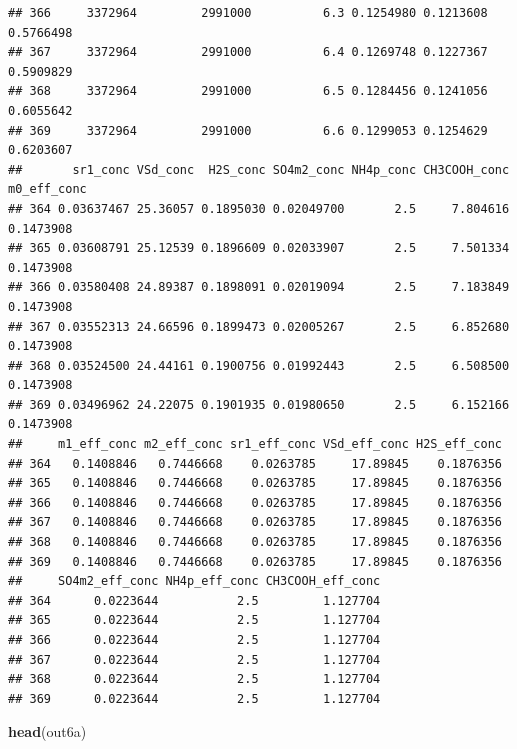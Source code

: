 \documentclass[
]{article}
\newenvironment{Shaded}{\begin{snugshade}}{\end{snugshade}}
\newcommand{\FunctionTok}[1]{\textcolor[rgb]{0.13,0.29,0.53}{\textbf{#1}}}
\newcommand{\NormalTok}[1]{#1}
\begin{document}
\begin{verbatim}
## 366     3372964         2991000          6.3 0.1254980 0.1213608 0.5766498
## 367     3372964         2991000          6.4 0.1269748 0.1227367 0.5909829
## 368     3372964         2991000          6.5 0.1284456 0.1241056 0.6055642
## 369     3372964         2991000          6.6 0.1299053 0.1254629 0.6203607
##       sr1_conc VSd_conc  H2S_conc SO4m2_conc NH4p_conc CH3COOH_conc m0_eff_conc
## 364 0.03637467 25.36057 0.1895030 0.02049700       2.5     7.804616   0.1473908
## 365 0.03608791 25.12539 0.1896609 0.02033907       2.5     7.501334   0.1473908
## 366 0.03580408 24.89387 0.1898091 0.02019094       2.5     7.183849   0.1473908
## 367 0.03552313 24.66596 0.1899473 0.02005267       2.5     6.852680   0.1473908
## 368 0.03524500 24.44161 0.1900756 0.01992443       2.5     6.508500   0.1473908
## 369 0.03496962 24.22075 0.1901935 0.01980650       2.5     6.152166   0.1473908
##     m1_eff_conc m2_eff_conc sr1_eff_conc VSd_eff_conc H2S_eff_conc
## 364   0.1408846   0.7446668    0.0263785     17.89845    0.1876356
## 365   0.1408846   0.7446668    0.0263785     17.89845    0.1876356
## 366   0.1408846   0.7446668    0.0263785     17.89845    0.1876356
## 367   0.1408846   0.7446668    0.0263785     17.89845    0.1876356
## 368   0.1408846   0.7446668    0.0263785     17.89845    0.1876356
## 369   0.1408846   0.7446668    0.0263785     17.89845    0.1876356
##     SO4m2_eff_conc NH4p_eff_conc CH3COOH_eff_conc
## 364      0.0223644           2.5         1.127704
## 365      0.0223644           2.5         1.127704
## 366      0.0223644           2.5         1.127704
## 367      0.0223644           2.5         1.127704
## 368      0.0223644           2.5         1.127704
## 369      0.0223644           2.5         1.127704
\end{verbatim}

\begin{Shaded}
\begin{Highlighting}[]
\FunctionTok{head}\NormalTok{(out6a)}
\end{Highlighting}
\end{Shaded}
\end{document}
